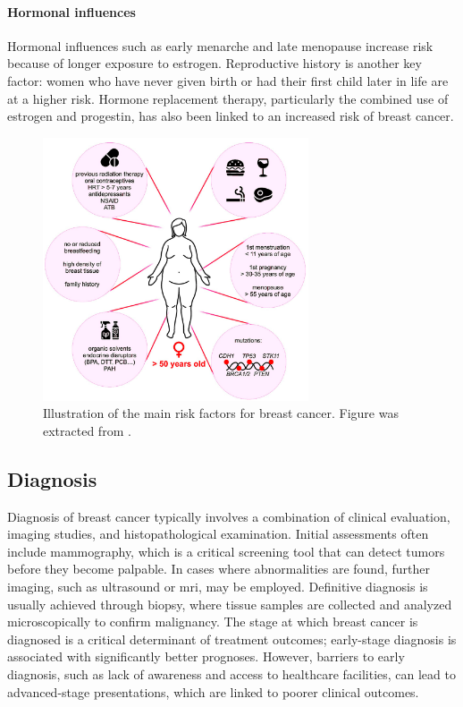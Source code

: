 \paragraph{Hormonal influences}
Hormonal influences such as early menarche and late menopause increase risk
because of longer exposure to estrogen\supercite{nounu_sex_2022}.
Reproductive history is another key factor: women who have never given birth or
had their first child later in life are at a higher
risk\supercite{claudia_admoun_etiology_2022}.
Hormone replacement therapy, particularly the combined use of estrogen and
progestin, has also been linked to an increased risk of breast
cancer\supercite{turner_meta-analysis_2011}.

\begin{figure}[ht]
    \centering

    \includegraphics[width=0.7\textwidth]{chapters/2_background/figures/risk-factors.png}
    \caption{Illustration of the main risk factors for breast cancer.
        Figure was extracted from \textcite{clusan_basic_2023}.
    }
    \label{fig:brca_risk-factors}
\end{figure}

\subsection{Diagnosis}
\label{sec:brca_diagnosis}

Diagnosis of breast cancer typically involves a combination of clinical
evaluation, imaging studies, and histopathological examination.
Initial assessments often include mammography, which is a critical screening
tool that can detect tumors before they become
palpable\supercite{hameed_breast_2020}.
In cases where abnormalities are found, further imaging, such as ultrasound or
\gls{mri}, may be employed.
Definitive diagnosis is usually achieved through biopsy, where tissue samples
are collected and analyzed microscopically to confirm
malignancy\supercite{hameed_breast_2020}.
The stage at which breast cancer is diagnosed is a critical determinant of
treatment outcomes; early-stage diagnosis is associated with significantly
better prognoses\supercite{getachew_perceived_2020}.
However, barriers to early diagnosis, such as lack of awareness and access to
healthcare facilities, can lead to advanced-stage presentations, which are
linked to poorer clinical
outcomes\supercite{getachew_perceived_2020,dickens_stage_2014}.


